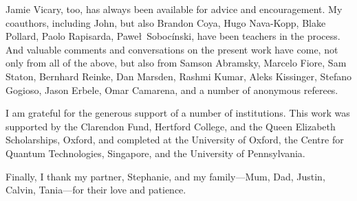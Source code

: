 Jamie Vicary, too, has always been available for advice and encouragement. My
coauthors, including John, but also Brandon Coya, Hugo Nava-Kopp, Blake Pollard,
Paolo Rapisarda, Pawe\l\ Soboc\'inski, have been teachers in the process.  And
valuable comments and conversations on the present work have come, not only from
all of the above, but also from Samson Abramsky, Marcelo Fiore, Sam Staton,
Bernhard Reinke, Dan Marsden, Rashmi Kumar, Aleks Kissinger, Stefano Gogioso,
Jason Erbele, Omar Camarena, and a number of anonymous referees.

I am grateful for the generous support of a number of institutions.  This work
was supported by the Clarendon Fund, Hertford College, and the Queen Elizabeth
Scholarships, Oxford, and completed at the University of Oxford, the Centre for
Quantum Technologies, Singapore, and the University of Pennsylvania.

Finally, I thank my partner, Stephanie, and my family---Mum, Dad, Justin,
Calvin, Tania---for their love and patience.


